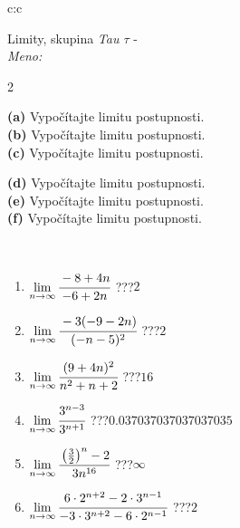 \documentclass[10pt]{report}
\begin{document}
\newpage
\thispagestyle{empty}
\begin{tabular}{c:c}
\begin{minipage}[c][104.5mm][t]{0.5\linewidth}
\begin{center}
\vspace{5mm}
{\huge Limity, skupina \textit{Tau $\tau$} -}\\[5mm]
\textit{Meno:}\phantom{xxxxxxxxxxxxxxxxxxxxxxxxxxxxxxxxxxxxxxxxxxxxxxxxxxxxxxxxxxxxxxxxx}\\[5mm]
\begin{minipage}{0.95\linewidth}
\begin{center}
{\small \begin{multicols}{2} \raggedright
\textbf{(a)} Vypočítajte limitu postupnosti. \\[1mm]
\textbf{(b)} Vypočítajte limitu postupnosti. \\[1mm]
\textbf{(c)} Vypočítajte limitu postupnosti. \par \columnbreak
\textbf{(d)} Vypočítajte limitu postupnosti. \\[1mm]
\textbf{(e)} Vypočítajte limitu postupnosti. \\[1mm]
\textbf{(f)} Vypočítajte limitu postupnosti.
\end{multicols}
}
\end{center}
\end{minipage}
\\[1mm]
\begin{minipage}{0.79\linewidth}
\begin{center}
\begin{varwidth}{\linewidth}
\setlength{\itemsep}{0pt}
\begin{enumerate}
\footnotesizerr
\item $\lim\limits_{n\to\infty}\cfrac{-8+4n}{-6+2n}$\quad \dotfill\; ???\;\dotfill \quad $2$
\item $\lim\limits_{n\to\infty}\cfrac{-3(-9-2n)}{(-n-5)^2}$\quad \dotfill\; ???\;\dotfill \quad $2$
\item $\lim\limits_{n\to\infty}\cfrac{(9+4n)^2}{n^2+n+2}$\quad \dotfill\; ???\;\dotfill \quad $16$
\item $\lim\limits_{n\to\infty}\cfrac{3^{n-3}}{3^{n+1}}$\quad \dotfill\; ???\;\dotfill \quad $0.037037037037037035$
\item $\lim\limits_{n\to\infty}\cfrac{\left(\frac{3}{2}\right)^n -2}{3n^{16}}$\quad \dotfill\; ???\;\dotfill \quad $\infty$
\item $\lim\limits_{n\to\infty}\cfrac{6\cdot 2^{n+2}-2\cdot 3^{n-1}}{-3\cdot 3^{n+2}-6\cdot 2^{n-1}}$\quad \dotfill\; ???\;\dotfill \quad $2$

\end{enumerate}
\end{varwidth}
\end{center}
\end{minipage}
\end{center}
\end{minipage}
\end{tabular}
\end{document}
